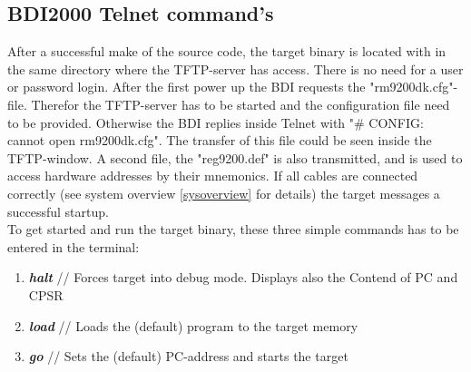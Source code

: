\subsection{BDI2000 Telnet command's} 

After a successful make of the source code, the target binary is located with in the same directory where the \ac{TFTP}-server has access. There is no need for a user or password login. After the first power up the BDI requests the "rm9200dk.cfg"-file. Therefor the \ac{TFTP}-server has to be started and the configuration file need to be provided. Otherwise the BDI replies inside Telnet with "\# CONFIG: cannot open rm9200dk.cfg". The transfer of this file could be seen inside the \ac{TFTP}-window. A second file, the "reg9200.def" is also transmitted, and is used to access hardware addresses by their mnemonics. If all cables are connected correctly (see system overview \ref{sysoverview} for details) the target messages a successful startup.\\
To get started and run the target binary, these three simple commands has to be entered in the terminal:
\begin{enumerate}
	\item \textbf{\textit{halt}} // Forces target into debug mode. Displays also the Contend of \ac{PC} and \ac{CPSR}
	\item \textbf{\textit{load}} // Loads the (default) program	to the target memory
	\item \textbf{\textit{go  }} // Sets the (default) \ac{PC}-address and starts the target 
	\end{enumerate}

